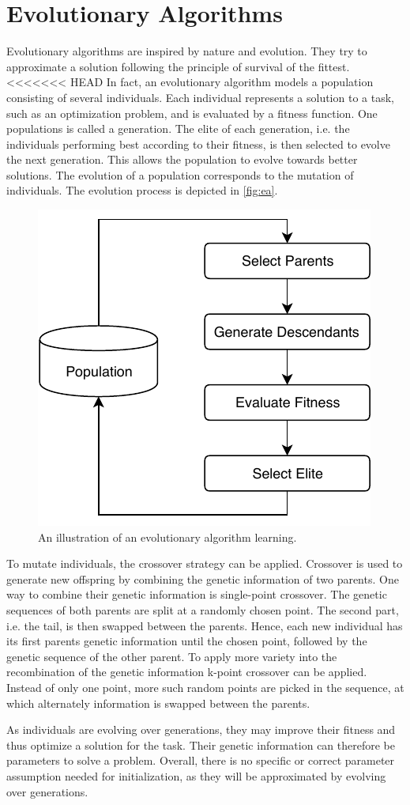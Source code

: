 \section{Evolutionary Algorithms}
\label{sec:ea}
Evolutionary algorithms are inspired by nature and evolution.
They try to approximate a solution following the principle of survival of the fittest.
<<<<<<< HEAD
In fact, an evolutionary algorithm models a population consisting of several individuals.
Each individual represents a solution to a task, such as an optimization problem, and is evaluated by a fitness function.
One populations is called a generation.
The elite of each generation, i.e. the individuals performing best according to their fitness, is then selected to evolve the next generation.
This allows the population to evolve towards better solutions.
The evolution of a population corresponds to the mutation of individuals.
The evolution process is depicted in \autoref{fig:ea}.

\begin{figure}[h]
\centering
\includegraphics[width=.7\columnwidth]{figures/ea_fig.pdf}
\caption{An illustration of an evolutionary algorithm learning. \cite{Dillmann2017}}
\label{fig:ea}
\end{figure}

To mutate individuals, the crossover strategy can be applied.
Crossover is used to generate new offspring by combining the genetic information of two parents.
One way to combine their genetic information is single-point crossover.
The genetic sequences of both parents are split at a randomly chosen point.
The second part, i.e. the tail, is then swapped between the parents.
Hence, each new individual has its first parents genetic information until the chosen point, followed by the genetic sequence of the other parent.
To apply more variety into the recombination of the genetic information k-point crossover can be applied.
Instead of only one point, more such random points are picked in the sequence, at which alternately information is swapped between the parents.
\cite{Dillmann2017}

As individuals are evolving over generations, they may improve their fitness and thus optimize a solution for the task.
Their genetic information can therefore be parameters to solve a problem.
Overall, there is no specific or correct parameter assumption needed for initialization, as they will be approximated by evolving over generations.
